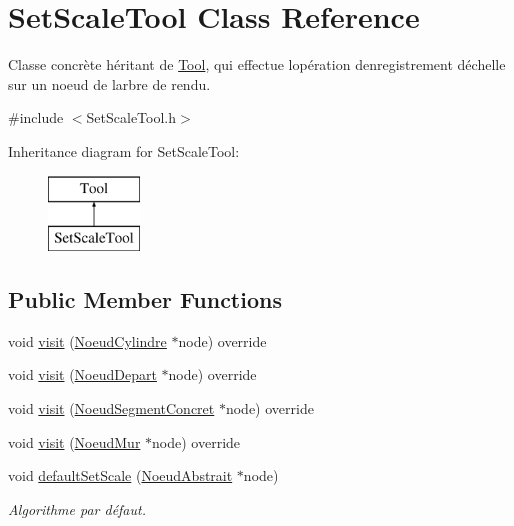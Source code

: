 \hypertarget{class_set_scale_tool}{}\section{Set\+Scale\+Tool Class Reference}
\label{class_set_scale_tool}


Classe concrète héritant de \hyperlink{class_tool}{Tool}, qui effectue l\textquotesingle{}opération d\textquotesingle{}enregistrement d\textquotesingle{}échelle sur un noeud de l\textquotesingle{}arbre de rendu.  




{\ttfamily \#include $<$Set\+Scale\+Tool.\+h$>$}

Inheritance diagram for Set\+Scale\+Tool\+:\begin{figure}[H]
\begin{center}
\leavevmode
\includegraphics[height=2.000000cm]{class_set_scale_tool}
\end{center}
\end{figure}
\subsection*{Public Member Functions}
\begin{DoxyCompactItemize}
\item 
void \hyperlink{group__inf2990_gae12ec27e420078166d0f1fbce51ea3c1}{visit} (\hyperlink{class_noeud_cylindre}{Noeud\+Cylindre} $\ast$node) override
\item 
void \hyperlink{group__inf2990_ga372ff3eab42997c84eb768fdf72a5dcc}{visit} (\hyperlink{class_noeud_depart}{Noeud\+Depart} $\ast$node) override
\item 
void \hyperlink{group__inf2990_ga3f0a73ab0f183d9d4e3a6820442f17a2}{visit} (\hyperlink{class_noeud_segment_concret}{Noeud\+Segment\+Concret} $\ast$node) override
\item 
void \hyperlink{group__inf2990_ga51cfb7f08b02858b45b2beb9e51a8dce}{visit} (\hyperlink{class_noeud_mur}{Noeud\+Mur} $\ast$node) override
\item 
void \hyperlink{group__inf2990_ga589b51975cc03cea1752747ef558a45d}{default\+Set\+Scale} (\hyperlink{class_noeud_abstrait}{Noeud\+Abstrait} $\ast$node)
\begin{DoxyCompactList}\small\item\em Algorithme par défaut. \end{DoxyCompactList}\end{DoxyCompactItemize}



